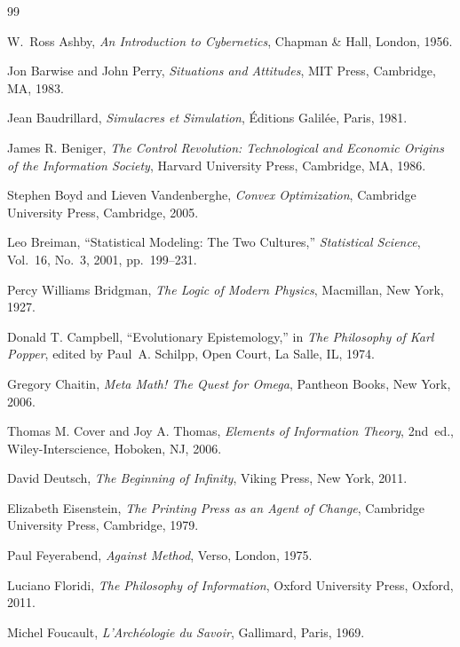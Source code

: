 \documentclass[12pt, openright, twoside]{book}
\begin{document}
\begin{thebibliography}{99}

W.~Ross Ashby,
\textit{An Introduction to Cybernetics},
Chapman \& Hall, London, 1956.

Jon Barwise and John Perry,
\textit{Situations and Attitudes},
MIT Press, Cambridge, MA, 1983.

Jean Baudrillard,
\textit{Simulacres et Simulation},
\'Editions Galil\'ee, Paris, 1981.

James R. Beniger,
\textit{The Control Revolution: Technological and Economic Origins of the Information Society},
Harvard University Press, Cambridge, MA, 1986.

Stephen Boyd and Lieven Vandenberghe,
\textit{Convex Optimization},
Cambridge University Press, Cambridge, 2005.

Leo Breiman,
``Statistical Modeling: The Two Cultures,''
\textit{Statistical Science},
Vol.~16, No.~3, 2001, pp.~199--231.

Percy Williams Bridgman,
\textit{The Logic of Modern Physics},
Macmillan, New York, 1927.

Donald T. Campbell,
``Evolutionary Epistemology,''
in \textit{The Philosophy of Karl Popper},
edited by Paul~A. Schilpp,
Open Court, La Salle, IL, 1974.

Gregory Chaitin,
\textit{Meta Math! The Quest for Omega},
Pantheon Books, New York, 2006.

Thomas M. Cover and Joy A. Thomas,
\textit{Elements of Information Theory},
2nd~ed.,
Wiley-Interscience, Hoboken, NJ, 2006.

David Deutsch,
\textit{The Beginning of Infinity},
Viking Press, New York, 2011.

Elizabeth Eisenstein,
\textit{The Printing Press as an Agent of Change},
Cambridge University Press, Cambridge, 1979.

Paul Feyerabend,
\textit{Against Method},
Verso, London, 1975.

Luciano Floridi,
\textit{The Philosophy of Information},
Oxford University Press, Oxford, 2011.

Michel Foucault,
\textit{L'Arch\'eologie du Savoir},
Gallimard, Paris, 1969.


\end{thebibliography}
\end{document}
